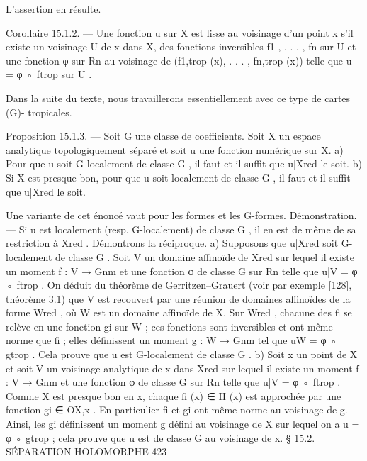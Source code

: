 \documentclass[
  10pt,
]{article}
\newenvironment{Shaded}{}{}
\newcommand{\NormalTok}[1]{#1}
\begin{document}
\begin{Shaded}
\begin{Highlighting}[]
\NormalTok{L’assertion en résulte.}


\NormalTok{Corollaire 15.1.2. — Une fonction u sur X est lisse au voisinage d’un point x s’il}
\NormalTok{existe un voisinage U de x dans X, des fonctions inversibles f1 , . . . , fn sur U et une}
\NormalTok{fonction φ sur Rn au voisinage de (f1,trop (x), . . . , fn,trop (x)) telle que u = φ ◦ ftrop sur U .}

\NormalTok{  Dans la suite du texte, nous travaillerons essentiellement avec ce type de cartes (G){-}}
\NormalTok{tropicales.}

\NormalTok{Proposition 15.1.3. — Soit G une classe de coefficients. Soit X un espace analytique}
\NormalTok{topologiquement séparé et soit u une fonction numérique sur X.}
\NormalTok{  a) Pour que u soit G{-}localement de classe G , il faut et il suffit que u|Xred le soit.}
\NormalTok{  b) Si X est presque bon, pour que u soit localement de classe G , il faut et il suffit que}
\NormalTok{u|Xred le soit.}

\NormalTok{  Une variante de cet énoncé vaut pour les formes et les G{-}formes.}
\NormalTok{Démonstration. — Si u est localement (resp. G{-}localement) de classe G , il en est de}
\NormalTok{même de sa restriction à Xred . Démontrons la réciproque.}
\NormalTok{   a) Supposons que u|Xred soit G{-}localement de classe G . Soit V un domaine affinoïde}
\NormalTok{de Xred sur lequel il existe un moment f : V → Gnm et une fonction φ de classe G sur Rn}
\NormalTok{telle que u|V = φ ◦ ftrop . On déduit du théorème de Gerritzen–Grauert (voir par exemple}
\NormalTok{[128], théorème 3.1) que V est recouvert par une réunion de domaines affinoïdes de la}
\NormalTok{forme Wred , où W est un domaine affinoïde de X. Sur Wred , chacune des fi se relève}
\NormalTok{en une fonction gi sur W ; ces fonctions sont inversibles et ont même norme que fi ;}
\NormalTok{elles définissent un moment g : W → Gnm tel que uW = φ ◦ gtrop . Cela prouve que u est}
\NormalTok{G{-}localement de classe G .}
\NormalTok{   b) Soit x un point de X et soit V un voisinage analytique de x dans Xred sur lequel}
\NormalTok{il existe un moment f : V → Gnm et une fonction φ de classe G sur Rn telle que u|V =}
\NormalTok{φ ◦ ftrop . Comme X est presque bon en x, chaque fi (x) ∈ H (x) est approchée par une}
\NormalTok{fonction gi ∈ OX,x . En particulier fi et gi ont même norme au voisinage de g. Ainsi, les}
\NormalTok{gi définissent un moment g défini au voisinage de X sur lequel on a u = φ ◦ gtrop ; cela}
\NormalTok{prouve que u est de classe G au voisinage de x.}
\NormalTok{                              § 15.2. SÉPARATION HOLOMORPHE                                423}


\end{Highlighting}
\end{Shaded}
\end{document}
